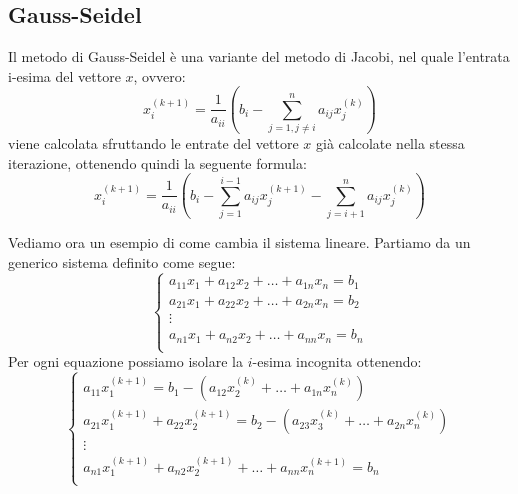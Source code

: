 \subsection{Gauss-Seidel}
Il metodo di Gauss-Seidel è una variante del metodo di Jacobi, nel quale l'entrata
i-esima del vettore $x$, ovvero:
\begin{equation}
    x_i^{(k+1)} = \frac{1}{a_{ii}}(b_i - \sum_{j = 1, j \neq i}^{n}a_{ij}x_j^{(k)})
\end{equation}
viene calcolata sfruttando le entrate del vettore $x$ già calcolate nella stessa
iterazione, ottenendo quindi la seguente formula:
\begin{equation}
    x_i^{(k+1)} = \frac{1}{a_{ii}}(b_i - \sum_{j = 1}^{i-1}a_{ij}x_j^{(k+1)} - \sum_{j = i+1}^{n}a_{ij}x_j^{(k)})
\end{equation}
\begin{esempio}
    Vediamo ora un esempio di come cambia il sistema lineare. Partiamo da un
    generico sistema definito come segue:
    \begin{equation}
        \begin{cases}
            a_{11}x_1 + a_{12} x_2 + \dots + a_{1n} x_n= b_1 \\
            a_{21}x_1 + a_{22} x_2 + \dots + a_{2n} x_n= b_2 \\
            \vdots                                           \\
            a_{n1}x_1 + a_{n2} x_2 + \dots + a_{nn} x_n= b_n \\
        \end{cases}
    \end{equation}
    Per ogni equazione possiamo isolare la $i$-esima incognita ottenendo:
    \begin{equation}
        \begin{cases}
            a_{11}x_1^{(k+1)} = b_1 - (a_{12} x_2^{(k)} + \dots + a_{1n} x_n^{(k)})                    \\
            a_{21}x_1^{(k+1)} + a_{22} x_2^{(k+1)}= b_2 - (a_{23} x_3^{(k)}+ \dots + a_{2n} x_n^{(k)}) \\
            \vdots                                                                                     \\
            a_{n1}x_1^{(k+1)} + a_{n2} x_2^{(k+1)} + \dots + a_{nn} x_n^{(k+1)}= b_n                   \\
        \end{cases}
    \end{equation}
\end{esempio}
